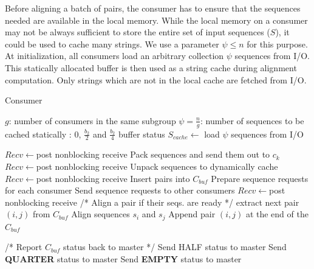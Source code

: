 \documentclass[10pt,journal,letterpaper,compsoc]{IEEEtran}
\begin{document}
Before aligning a batch of pairs, the consumer has to ensure that the sequences needed are available in the local memory. While the local memory on a consumer may not be always sufficient to store the entire set of input sequences ($S$), it could be used to cache many strings. We use a parameter $\psi \leq n$ for this purpose. At initialization, all consumers load an arbitrary collection $\psi$ sequences from I/O. This statically allocated buffer is then used as a string cache during alignment computation. Only strings which are not in the local cache are fetched from I/O.\\


\begin{algorithm}
\caption{Consumer}
\label{cs}
\begin{algorithmic}[1]
    \STATE $g$: number of consumers in the same subgroup
    \STATE $\psi=\frac{n}{g}$: number of sequences to be cached statically
    : $0$, $\frac{b_2}{2}$ and $\frac{b_2}{4}$ buffer status
    \STATE $S_{cache}\leftarrow$ load $\psi$ sequences from I/O
      
    \STATE $Recv\leftarrow$post nonblocking receive
    \WHILE {\TRUE}
			\STATE Pack sequences and send them out to $c_{k}$
			\STATE $Recv\leftarrow$post nonblocking receive
			\STATE Unpack sequences to dynamically cache
			\STATE $Recv\leftarrow$post nonblocking receive
		        \STATE Insert pairs into $C_{buf}$
			\STATE Prepare sequence requests for each consumer
			\STATE Send sequence requests to other consumers
			\STATE $Recv\leftarrow$post nonblocking receive
	        \ENDIF
	    \ELSE
			\STATE /* Align a pair if their seqs. are ready */
	    		\STATE extract next pair $(i, j)$ from $C_{buf}$
				\STATE Align sequences $s_{i}$ and $s_{j}$
			\ELSE
				\STATE Append pair $(i, j)$ at the end of the $C_{buf}$
			\ENDIF
			
			\STATE /* Report $C_{buf}$ status back to master */
				\STATE Send HALF status to master
				\STATE Send {\bf QUARTER} status to master
				\STATE Send {\bf EMPTY} status to master
			\ENDIF
		\ENDIF
            \ENDIF
    \ENDWHILE
\end{algorithmic}
\end{algorithm}
\end{document}
